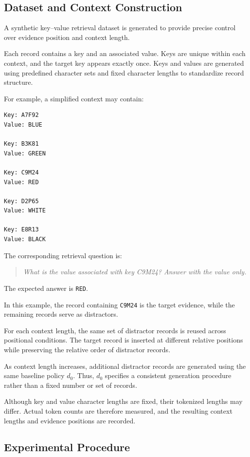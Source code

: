 \subsection{Dataset and Context Construction}
\label{subsec:dataset}

A synthetic key--value retrieval dataset is generated
to provide precise control over evidence position
and context length.

Each record contains a key and an associated value.
Keys are unique within each context, and the target
key appears exactly once. Keys and values are generated
using predefined character sets and fixed character
lengths to standardize record structure.

For example, a simplified context may contain:

\begin{verbatim}
Key: A7F92
Value: BLUE

Key: B3K81
Value: GREEN

Key: C9M24
Value: RED

Key: D2P65
Value: WHITE

Key: E8R13
Value: BLACK
\end{verbatim}

The corresponding retrieval question is:

\begin{quote}
\textit{What is the value associated with key C9M24?
Answer with the value only.}
\end{quote}

The expected answer is \texttt{RED}.

In this example, the record containing
\texttt{C9M24} is the target evidence,
while the remaining records serve as distractors.

For each context length, the same set of distractor
records is reused across positional conditions.
The target record is inserted at different relative
positions while preserving the relative order of
distractor records.

As context length increases, additional distractor
records are generated using the same baseline policy
$d_0$. Thus, $d_0$ specifies a consistent generation
procedure rather than a fixed number or set of records.

Although key and value character lengths are fixed,
their tokenized lengths may differ. Actual token counts
are therefore measured, and the resulting context
lengths and evidence positions are recorded.

\subsection{Experimental Procedure}
\label{subsec:procedure}

